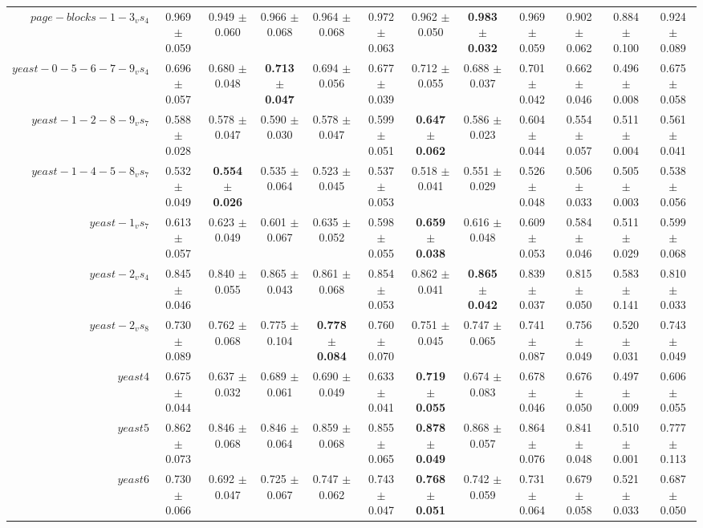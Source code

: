 \begin{table}[!ht]
{\begin{tabular}{r c c c c c c c c c c c}
$page-blocks-1-3_vs_4$ & 0.969 $\pm$ 0.059 & 0.949 $\pm$ 0.060 & 0.966 $\pm$ 0.068 & 0.964 $\pm$ 0.068 & 0.972 $\pm$ 0.063 & 0.962 $\pm$ 0.050 & \textbf{0.983 $\pm$ 0.032} & 0.969 $\pm$ 0.059 & 0.902 $\pm$ 0.062 & 0.884 $\pm$ 0.100 & 0.924 $\pm$ 0.089 \\
$yeast-0-5-6-7-9_vs_4$ & 0.696 $\pm$ 0.057 & 0.680 $\pm$ 0.048 & \textbf{0.713 $\pm$ 0.047} & 0.694 $\pm$ 0.056 & 0.677 $\pm$ 0.039 & 0.712 $\pm$ 0.055 & 0.688 $\pm$ 0.037 & 0.701 $\pm$ 0.042 & 0.662 $\pm$ 0.046 & 0.496 $\pm$ 0.008 & 0.675 $\pm$ 0.058 \\
$yeast-1-2-8-9_vs_7$ & 0.588 $\pm$ 0.028 & 0.578 $\pm$ 0.047 & 0.590 $\pm$ 0.030 & 0.578 $\pm$ 0.047 & 0.599 $\pm$ 0.051 & \textbf{0.647 $\pm$ 0.062} & 0.586 $\pm$ 0.023 & 0.604 $\pm$ 0.044 & 0.554 $\pm$ 0.057 & 0.511 $\pm$ 0.004 & 0.561 $\pm$ 0.041 \\
$yeast-1-4-5-8_vs_7$ & 0.532 $\pm$ 0.049 & \textbf{0.554 $\pm$ 0.026} & 0.535 $\pm$ 0.064 & 0.523 $\pm$ 0.045 & 0.537 $\pm$ 0.053 & 0.518 $\pm$ 0.041 & 0.551 $\pm$ 0.029 & 0.526 $\pm$ 0.048 & 0.506 $\pm$ 0.033 & 0.505 $\pm$ 0.003 & 0.538 $\pm$ 0.056 \\
$yeast-1_vs_7$ & 0.613 $\pm$ 0.057 & 0.623 $\pm$ 0.049 & 0.601 $\pm$ 0.067 & 0.635 $\pm$ 0.052 & 0.598 $\pm$ 0.055 & \textbf{0.659 $\pm$ 0.038} & 0.616 $\pm$ 0.048 & 0.609 $\pm$ 0.053 & 0.584 $\pm$ 0.046 & 0.511 $\pm$ 0.029 & 0.599 $\pm$ 0.068 \\
$yeast-2_vs_4$ & 0.845 $\pm$ 0.046 & 0.840 $\pm$ 0.055 & 0.865 $\pm$ 0.043 & 0.861 $\pm$ 0.068 & 0.854 $\pm$ 0.053 & 0.862 $\pm$ 0.041 & \textbf{0.865 $\pm$ 0.042} & 0.839 $\pm$ 0.037 & 0.815 $\pm$ 0.050 & 0.583 $\pm$ 0.141 & 0.810 $\pm$ 0.033 \\
$yeast-2_vs_8$ & 0.730 $\pm$ 0.089 & 0.762 $\pm$ 0.068 & 0.775 $\pm$ 0.104 & \textbf{0.778 $\pm$ 0.084} & 0.760 $\pm$ 0.070 & 0.751 $\pm$ 0.045 & 0.747 $\pm$ 0.065 & 0.741 $\pm$ 0.087 & 0.756 $\pm$ 0.049 & 0.520 $\pm$ 0.031 & 0.743 $\pm$ 0.049 \\
$yeast4$ & 0.675 $\pm$ 0.044 & 0.637 $\pm$ 0.032 & 0.689 $\pm$ 0.061 & 0.690 $\pm$ 0.049 & 0.633 $\pm$ 0.041 & \textbf{0.719 $\pm$ 0.055} & 0.674 $\pm$ 0.083 & 0.678 $\pm$ 0.046 & 0.676 $\pm$ 0.050 & 0.497 $\pm$ 0.009 & 0.606 $\pm$ 0.055 \\
$yeast5$ & 0.862 $\pm$ 0.073 & 0.846 $\pm$ 0.068 & 0.846 $\pm$ 0.064 & 0.859 $\pm$ 0.068 & 0.855 $\pm$ 0.065 & \textbf{0.878 $\pm$ 0.049} & 0.868 $\pm$ 0.057 & 0.864 $\pm$ 0.076 & 0.841 $\pm$ 0.048 & 0.510 $\pm$ 0.001 & 0.777 $\pm$ 0.113 \\
$yeast6$ & 0.730 $\pm$ 0.066 & 0.692 $\pm$ 0.047 & 0.725 $\pm$ 0.067 & 0.747 $\pm$ 0.062 & 0.743 $\pm$ 0.047 & \textbf{0.768 $\pm$ 0.051} & 0.742 $\pm$ 0.059 & 0.731 $\pm$ 0.064 & 0.679 $\pm$ 0.058 & 0.521 $\pm$ 0.033 & 0.687 $\pm$ 0.050 \\

\end{tabular}}
\end{table}

